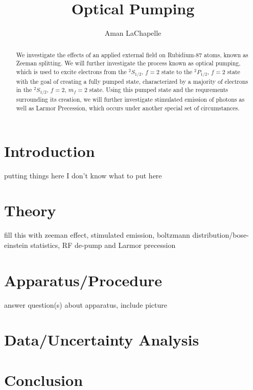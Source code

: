 \documentclass{article}
\title{Optical Pumping}
\author{Aman LaChapelle}
\begin{document}
\raggedright
\maketitle

\begin{abstract}
  We investigate the effects of an applied external field on Rubidium-87 atoms, known as Zeeman splitting.  We will further investigate the process known as optical pumping, which is used to excite electrons from the $^2S_{1/2},\, f = 2$ state to the $^2P_{1/2},\, f = 2$ state with the goal of creating a fully pumped state, characterized by a majority of electrons in the $^2S_{1/2},\, f = 2,\, m_f = 2$ state.  Using this pumped state and the requrements surrounding its creation, we will further investigate stimulated emission of photons as well as Larmor Precession, which occurs under another special set of circumstances.
\end{abstract}

\tableofcontents
\newpage

\section{Introduction}%
  putting things here I don't know what to put here
\section{Theory}%
  fill this with zeeman effect, stimulated emission, boltzmann distribution/bose-einstein statistics, RF de-pump and Larmor precession
\section{Apparatus/Procedure}%
  answer question(s) about apparatus, include picture
\section{Data/Uncertainty Analysis}%

\section{Conclusion}%

%
%
\end{document}
